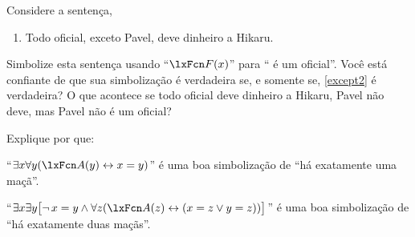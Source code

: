 
\problempart
Considere a sentença,
\begin{enumerate}
\item\label{except2} Todo oficial, exceto Pavel, deve dinheiro a Hikaru.
\end{enumerate}
Simbolize esta sentença usando \textquotedblleft $\atom{F}{x}$\textquotedblright{} para \textquotedblleft {} é um oficial\textquotedblright{}. Você está confiante de que sua simbolização é verdadeira se, e somente se, \cref*{except2} é verdadeira? O que acontece se todo oficial deve dinheiro a Hikaru, Pavel não deve, mas Pavel não é um oficial?

\problempart
Explique por que:
	\begin{compactlist}
\item \textquotedblleft $\exists x \forall y(\atom{A}{y} \eiff x= y)$\textquotedblright{} é uma boa simbolização de \textquotedblleft há exatamente uma maçã\textquotedblright{}.

\item \textquotedblleft $\exists x \exists y \bigl[\enot\, {x = y} \eand \forall
z(\atom{A}{z} \eiff (x= z \eor y = z))\bigr]$\textquotedblright{} é uma boa
simbolização de \textquotedblleft há exatamente duas maçãs\textquotedblright{}.
	\end{compactlist}


